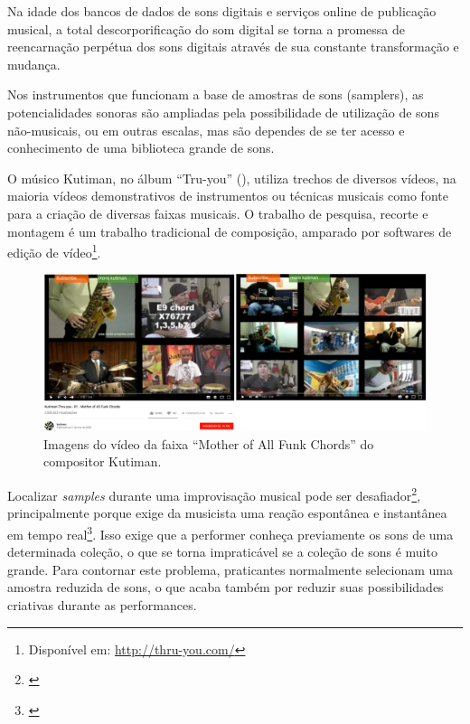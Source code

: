 \begin{citacao}
Na idade dos bancos de dados de sons digitais e serviços online de publicação musical, a total descorporificação do som digital se torna a promessa de reencarnação perpétua dos sons digitais através de sua constante transformação e mudança.\cite{Schnell2013}

\end{citacao}

Nos instrumentos que funcionam a base de amostras de sons (samplers), as potencialidades sonoras são ampliadas pela possibilidade de utilização de sons não-musicais, ou em outras escalas, mas são dependes de se ter acesso e conhecimento de uma biblioteca grande de sons. 

O músico Kutiman, no álbum ``Tru-you'' (\citeyear{Kutiman2010}), utiliza trechos de diversos vídeos, na maioria vídeos demonstrativos de instrumentos ou técnicas musicais como fonte para a criação de diversas faixas musicais. O trabalho de pesquisa, recorte e montagem é um trabalho tradicional de composição, amparado por softwares de edição de vídeo\footnote{Disponível em: \url{http://thru-you.com/}}. 


\begin{figure}
\includegraphics[width=1\textwidth]{pictures/cap4/kutiman}
\caption{Imagens do vídeo da faixa ``Mother of All Funk Chords'' do compositor Kutiman. }
\label{Kutiman}
\end{figure}


Localizar \emph{samples} durante uma improvisação musical pode ser desafiador\footnote{\cite{Xambo2018}}, principalmente porque exige da musicista uma reação espontânea e instantânea em tempo real\footnote{\cite{canonne2011model}}. Isso exige que a performer conheça previamente os sons de uma determinada coleção, o que se torna impraticável se a coleção de sons é muito grande. Para contornar este problema, praticantes normalmente selecionam uma amostra reduzida de sons, o que acaba também por reduzir suas possibilidades criativas durante as performances.

